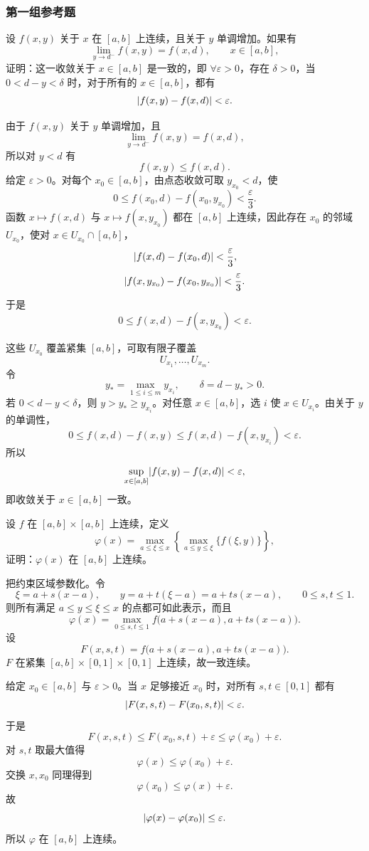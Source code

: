 \subsubsection*{第一组参考题}

\begin{xreferenceproblem}[1]
设 $f(x,y)$ 关于 $x$ 在 $[a,b]$ 上连续，且关于 $y$ 单调增加。如果有
  \[
    \lim_{y\to d^-}f(x,y)=f(x,d),\qquad x\in[a,b],
  \]
  证明：这一收敛关于 $x\in[a,b]$ 是一致的，即 $\forall\varepsilon>0$，存在 $\delta>0$，当 $0<d-y<\delta$ 时，对于所有的 $x\in[a,b]$，都有
  \[
    \lvert f(x,y)-f(x,d)\rvert<\varepsilon.
  \]
\end{xreferenceproblem}
\begin{xsolution}
由于 $f(x,y)$ 关于 $y$ 单调增加，且
\[
  \lim_{y\to d^-}f(x,y)=f(x,d),
\]
所以对 $y<d$ 有
\[
  f(x,y)\le f(x,d).
\]
给定 $\varepsilon>0$。对每个 $x_0\in[a,b]$，由点态收敛可取 $y_{x_0}<d$，使
\[
  0\le f(x_0,d)-f(x_0,y_{x_0})<\frac\varepsilon3.
\]
函数 $x\mapsto f(x,d)$ 与 $x\mapsto f(x,y_{x_0})$ 都在 $[a,b]$ 上连续，因此存在 $x_0$ 的邻域 $U_{x_0}$，使对 $x\in U_{x_0}\cap[a,b]$，
\[
  \lvert f(x,d)-f(x_0,d)\rvert<\frac\varepsilon3,
\]
\[
  \lvert f(x,y_{x_0})-f(x_0,y_{x_0})\rvert<\frac\varepsilon3.
\]
于是
\[
  0\le f(x,d)-f(x,y_{x_0})<\varepsilon.
\]

这些 $U_{x_0}$ 覆盖紧集 $[a,b]$，可取有限子覆盖
\[
  U_{x_1},\ldots,U_{x_m}.
\]
令
\[
  y_*=\max_{1\le i\le m}y_{x_i},
  \qquad
  \delta=d-y_*>0.
\]
若 $0<d-y<\delta$，则 $y>y_*\ge y_{x_i}$。对任意 $x\in[a,b]$，选 $i$ 使 $x\in U_{x_i}$。由关于 $y$ 的单调性，
\[
  0\le f(x,d)-f(x,y)
  \le f(x,d)-f(x,y_{x_i})<\varepsilon.
\]
所以
\[
  \sup_{x\in[a,b]}\lvert f(x,y)-f(x,d)\rvert<\varepsilon,
\]
即收敛关于 $x\in[a,b]$ 一致。
\end{xsolution}


\begin{xreferenceproblem}[2]
设 $f$ 在 $[a,b]\times[a,b]$ 上连续，定义
  \[
    \varphi(x)=\max_{a\le\xi\le x}
    \left\{\max_{a\le y\le\xi}\{f(\xi,y)\}\right\},
  \]
  证明：$\varphi(x)$ 在 $[a,b]$ 上连续。
\end{xreferenceproblem}
\begin{xsolution}
把约束区域参数化。令
\[
  \xi=a+s(x-a),
  \qquad
  y=a+t(\xi-a)=a+ts(x-a),
  \qquad 0\le s,t\le1.
\]
则所有满足 $a\le y\le\xi\le x$ 的点都可如此表示，而且
\[
  \varphi(x)
  =\max_{0\le s,t\le1}
  f\bigl(a+s(x-a),a+ts(x-a)\bigr).
\]
设
\[
  F(x,s,t)=f\bigl(a+s(x-a),a+ts(x-a)\bigr).
\]
$F$ 在紧集 $[a,b]\times[0,1]\times[0,1]$ 上连续，故一致连续。

给定 $x_0\in[a,b]$ 与 $\varepsilon>0$。当 $x$ 足够接近 $x_0$ 时，对所有 $s,t\in[0,1]$ 都有
\[
  \lvert F(x,s,t)-F(x_0,s,t)\rvert<\varepsilon.
\]
于是
\[
  F(x,s,t)\le F(x_0,s,t)+\varepsilon
  \le\varphi(x_0)+\varepsilon.
\]
对 $s,t$ 取最大值得
\[
  \varphi(x)\le\varphi(x_0)+\varepsilon.
\]
交换 $x,x_0$ 同理得到
\[
  \varphi(x_0)\le\varphi(x)+\varepsilon.
\]
故
\[
  \lvert\varphi(x)-\varphi(x_0)\rvert\le\varepsilon.
\]
所以 $\varphi$ 在 $[a,b]$ 上连续。
\end{xsolution}


